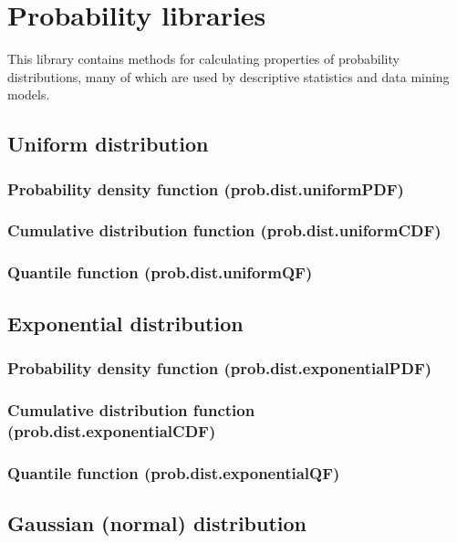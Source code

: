\documentclass{article}
\theoremstyle{definition}
\begin{document}
\pagebreak

\section{Probability libraries}

This library contains methods for calculating properties of probability distributions, many of which are used by descriptive statistics and data mining models.

\subsection{Uniform distribution}
\subsubsection{Probability density function (prob.dist.uniformPDF)}
\subsubsection{Cumulative distribution function (prob.dist.uniformCDF)}
\subsubsection{Quantile function (prob.dist.uniformQF)}

\subsection{Exponential distribution}
\subsubsection{Probability density function (prob.dist.exponentialPDF)}
\subsubsection{Cumulative distribution function (prob.dist.exponentialCDF)}
\subsubsection{Quantile function (prob.dist.exponentialQF)}

\subsection{Gaussian (normal) distribution}
\end{document}
